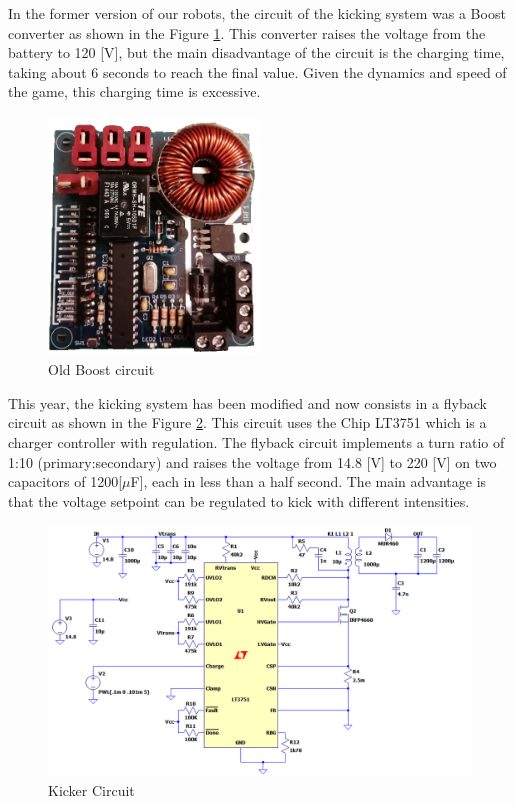\documentclass{llncs}
\newcommand{\TR}[1]{{\textcolor{cyan}{[TR: #1]}}}   %
\begin{document}
In the former version of our robots, the circuit of the kicking system was a Boost converter as shown in the Figure \ref{fig:old_boost}. This converter raises the voltage from the battery to 120 [V], but the main disadvantage of the circuit is the charging time, taking about 6 seconds to reach the final value. Given the dynamics and speed of the game, this charging time is excessive.

\begin{figure}[h]
    \centering
    \includegraphics[width=0.5\textwidth]{Images/foto_boost.jpg}
    \caption{Old Boost circuit}
    \label{fig:old_boost}
\end{figure}

This year, the kicking system has been modified and now consists in a flyback circuit as shown in the Figure \ref{fig:kicker}. This circuit uses the Chip LT3751 which is a charger controller with regulation. The flyback circuit implements a turn ratio of 1:10 (primary:secondary) and raises the voltage from 14.8 [V] to 220 [V] on two capacitors of 1200[$\mu$F], each in less than a half second. The main advantage is that the voltage setpoint can be regulated to kick with different intensities.

\begin{figure}[h]
    \centering
    \includegraphics[scale=0.4]{Images/kicker_spice.png}
    \caption{Kicker Circuit}
    \label{fig:kicker}
\end{figure}
\end{document}
